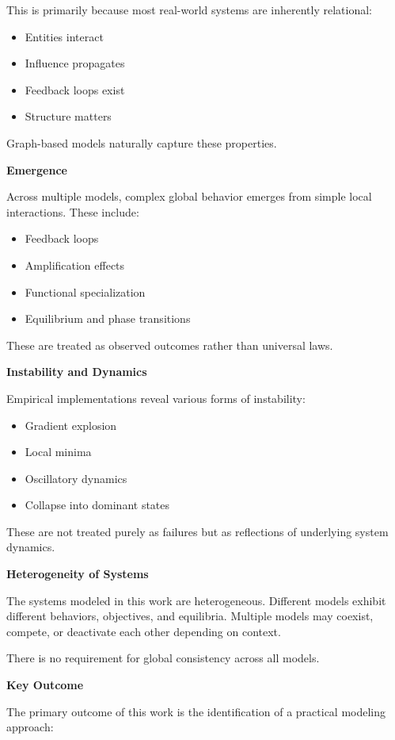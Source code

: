 This is primarily because most real-world systems are inherently relational:
\begin{itemize}
\item Entities interact
\item Influence propagates
\item Feedback loops exist
\item Structure matters
\end{itemize}

Graph-based models naturally capture these properties.

\textbf{Emergence}

Across multiple models, complex global behavior emerges from simple local interactions. These include:
\begin{itemize}
\item Feedback loops
\item Amplification effects
\item Functional specialization
\item Equilibrium and phase transitions
\end{itemize}

These are treated as observed outcomes rather than universal laws.

\textbf{Instability and Dynamics}

Empirical implementations reveal various forms of instability:
\begin{itemize}
\item Gradient explosion
\item Local minima
\item Oscillatory dynamics
\item Collapse into dominant states
\end{itemize}

These are not treated purely as failures but as reflections of underlying system dynamics.

\textbf{Heterogeneity of Systems}

The systems modeled in this work are heterogeneous. Different models exhibit different behaviors, objectives, and equilibria. Multiple models may coexist, compete, or deactivate each other depending on context.

There is no requirement for global consistency across all models.

\textbf{Key Outcome}

The primary outcome of this work is the identification of a practical modeling approach:

